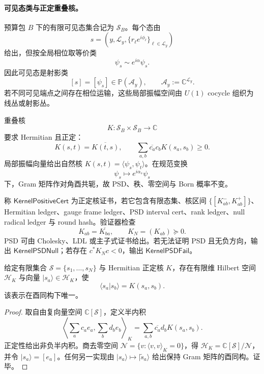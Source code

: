 \paragraph{可见态类与正定重叠核。}
预算包 \(B\) 下的有限可见态集合记为 \(\mathcal S_B\)。每个态由
\[
s=(y,\mathcal L_y,\{r_\ell e^{i\phi_\ell}\}_{\ell\in\mathcal L_y})
\]
给出，但按全局相位取等价类
\[
\psi_s\sim e^{i\alpha}\psi_s.
\]
因此可见态是射影类
\[
[s]=[\psi_s]\in\mathbb P(\mathcal A_y),
\qquad
\mathcal A_y:=\mathbb C^{\mathcal L_y}.
\]
若不同可见端点之间存在相位运输，这些局部振幅空间由 \(U(1)\) cocycle 组织为线丛或射影丛。

重叠核
\[
K:\mathcal S_B\times\mathcal S_B\to\mathbb C
\]
要求 Hermitian 且正定：
\[
K(s,t)=\overline{K(t,s)},
\qquad
\sum_{a,b}\overline{c_a}c_bK(s_a,s_b)\ge0.
\]
局部振幅向量给出自然核 \(K(s,t)=\langle\psi_s,\psi_t\rangle\)。在规范变换
\[
\psi_s\mapsto e^{i\alpha_s}\psi_s
\]
下，Gram 矩阵作对角酉共轭，故 PSD、秩、零空间与 Born 概率不变。

\begin{definition}[正定核证书]\label{def:typed-address-biaxial-completion-kernel-positive-cert}
称 \(\mathsf{KernelPositiveCert}\) 为正定核证书，若它包含有限态集、核区间 \(\{[K_{ab}^-,K_{ab}^+]\}\)、Hermitian ledger、gauge frame ledger、PSD interval cert、rank ledger、null radical ledger 与 round hash。验证器检查
\[
K_{ab}=\overline{K_{ba}},
\qquad
K_N=(K_{ab})\succeq0.
\]
PSD 可由 Cholesky、LDL 或主子式证书给出。若无法证明 PSD 且无负方向，输出 \(\mathsf{KernelPSDNull}\)；若存在 \(c^*K_Nc<0\)，输出 \(\mathsf{KernelPSDFail}\)。
\end{definition}

\begin{theorem}\label{thm:typed-address-biaxial-completion-positive-kernel-generates-hilbert-carrier}
给定有限集合 \(\mathcal S=\{s_1,\ldots,s_N\}\) 与 Hermitian 正定核 \(K\)，存在有限维 Hilbert 空间 \(\mathcal H_K\) 与向量 \(|s_a\rangle\in\mathcal H_K\)，使
\[
\langle s_a|s_b\rangle=K(s_a,s_b).
\]
该表示在酉同构下唯一。
\end{theorem}
\begin{proof}
取自由复向量空间 \(\mathbb C[\mathcal S]\)，定义半内积
\[
\left\langle\sum_a c_ae_a,\sum_b d_be_b\right\rangle_K
=
\sum_{a,b}\overline{c_a}d_bK(s_a,s_b).
\]
正定性给出非负半内积。商去零空间 \(\mathcal N=\{v:\langle v,v\rangle_K=0\}\)，得 \(\mathcal H_K=\mathbb C[\mathcal S]/\mathcal N\)，并令 \(|s_a\rangle=[e_a]\)。任何另一实现由 \(|s_a\rangle\mapsto|\widetilde s_a\rangle\) 给出保持 Gram 矩阵的酉同构。证毕。
\end{proof}

